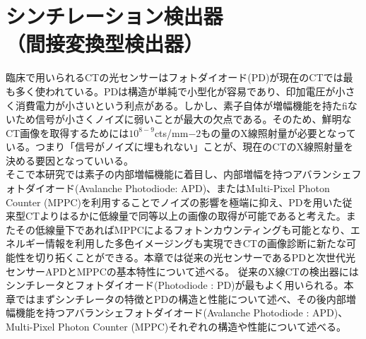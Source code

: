 \chapter{シンチレーション検出器\\（間接変換型検出器）}
臨床で用いられるCTの光センサーはフォトダイオード(PD)が現在のCTでは最も多く使われている。PDは構造が単純で小型化が容易であり、印加電圧が小さく消費電力が小さいという利点がある。しかし、素子自体が増幅機能を持たfiないため信号が小さくノイズに弱いことが最大の欠点である。そのため、鮮明なCT画像を取得するためには$10^{8-9}$cts/mm$-2$もの量のX線照射量が必要となっている。つまり「信号がノイズに埋もれない」ことが、現在のCTのX線照射量を決める要因となっていいる。\\
そこで本研究では素子の内部増幅機能に着目し、内部増幅を持つアバランシェフォトダイオード(Avalanche Photodiode: APD)、またはMulti-Pixel Photon Counter (MPPC)を利用することでノイズの影響を極端に抑え、PDを用いた従来型CTよりはるかに低線量で同等以上の画像の取得が可能であると考えた。またその低線量下であればMPPCによるフォトンカウンティングも可能となり、エネルギー情報を利用した多色イメージングも実現できCTの画像診断に新たな可能性を切り拓くことができる。本章では従来の光センサーであるPDと次世代光センサーAPDとMPPCの基本特性について述べる。
\fi
従来のX線CTの検出器にはシンチレータとフォトダイオード(Photodiode : PD)が最もよく用いられる。本章ではまずシンチレータの特徴とPDの構造と性能について述べ、その後内部増幅機能を持つアバランシェフォトダイオード(Avalanche Photodiode : APD)、Multi-Pixel Photon Counter (MPPC)それぞれの構造や性能について述べる。

